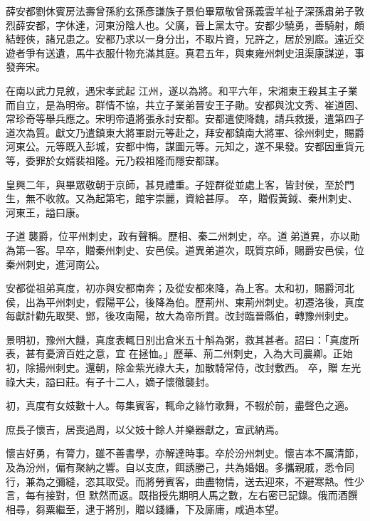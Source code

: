 
\begin{pinyinscope}

 薛安都劉休賓房法壽曾孫豹玄孫彥謙族子景伯畢眾敬曾孫義雲羊祉子深孫肅弟子敦烈薛安都，字休達，河東汾陰人也。父廣，晉上黨太守。安都少驍勇，善騎射，頗結輕俠，諸兄患之。安都乃求以一身分出，不取片資，兄許之，居於別廄。遠近交遊者爭有送遺，馬牛衣服什物充滿其庭。真君五年，與東雍州刺史沮渠康謀逆，事發奔宋。



 在南以武力見敘，遇宋孝武起
 江州，遂以為將。和平六年，宋湘東王殺其主子業而自立，是為明帝。群情不協，共立子業弟晉安王子勛。安都與沈文秀、崔道固、常珍奇等舉兵應之。宋明帝遺將張永討安都。安都遣使降魏，請兵救援，遣第四子道次為質。獻文乃遣鎮東大將軍尉元等赴之，拜安都鎮南大將軍、徐州刺史，賜爵河東公。元等既入彭城，安都中悔，謀圖元等。元知之，遂不果發。安都因重貨元等，委罪於女婿裴祖隆。元乃殺祖隆而隱安都謀。



 皇興二年，與畢眾敬朝于京師，甚見禮重。子姪群從並處上客，皆封侯，至於門生，無不收敘。又為起第宅，館宇崇麗，資給甚厚。
 卒，贈假黃鉞、秦州刺史、河東王，謚曰康。



 子道襲爵，位平州刺史，政有聲稱。歷相、秦二州刺史，卒。道弟道異，亦以勛為第一客。早卒，贈秦州刺史、安邑侯。道異弟道次，既質京師，賜爵安邑侯，位秦州刺史，進河南公。



 安都從祖弟真度，初亦與安都南奔；及從安都來降，為上客。太和初，賜爵河北侯，出為平州刺史，假陽平公，後降為伯。歷荊州、東荊州刺史。初遷洛後，真度每獻計勸先取樊、鄧，後攻南陽，故大為帝所賞。改封臨晉縣伯，轉豫州刺史。



 景明初，豫州大饑，真度表輒日別出倉米五十斛為粥，救其甚者。詔曰：「真度所表，甚有憂濟百姓之意，宜
 在拯恤。」歷華、荊二州刺史，入為大司農卿。正始初，除揚州刺史。還朝，除金紫光祿大夫，加散騎常侍，改封敷西。
 卒，贈
 左光祿大夫，謚曰莊。有子十二人，嫡子懷徹襲封。



 初，真度有女妓數十人。每集賓客，輒命之絲竹歌舞，不輟於前，盡聲色之適。



 庶長子懷吉，居喪過周，以父妓十餘人并樂器獻之，宣武納焉。



 懷吉好勇，有膂力，雖不善書學，亦解達時事。卒於汾州刺史。懷吉本不厲清節，及為汾州，偏有聚納之響。自以支庶，餌誘勝己，共為婚姻。多攜親戚，悉令同行，兼為之彌縫，恣其取受。而將勞賓客，曲盡物情，送去迎來，不避寒熱。性少言，每有接對，但
 默然而返。既指授先期明人馬之數，左右密已記錄。俄而酒饌相尋，芻粟繼至，逮于將別，贈以錢縑，下及廝庸，咸過本望。




\end{pinyinscope}
